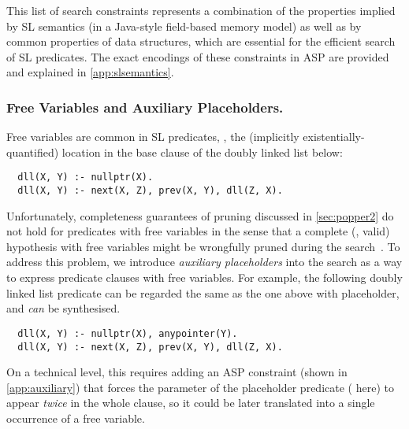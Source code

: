 \noindent
%
This list of search constraints represents a combination of the
properties implied by SL semantics (in a Java-style field-based memory
model) as well as by common properties of data structures, which are
essential for the efficient search of SL predicates.
%
The exact encodings of these constraints in ASP are provided and explained in \autoref{app:slsemantics}.

\subsubsection{Free Variables and Auxiliary Placeholders.}
\label{sec:auxiliary}

Free variables are common in SL predicates, \eg, the (implicitly
existentially-quantified) location  in the base clause of the
 doubly linked list below:
%
\begin{verbatim}
  dll(X, Y) :- nullptr(X).
  dll(X, Y) :- next(X, Z), prev(X, Y), dll(Z, X).
\end{verbatim}
%
Unfortunately, completeness guarantees of pruning discussed in \autoref{sec:popper2}  do not hold for
predicates with free variables in the sense that
 a complete (\ie, valid) hypothesis with free
variables might  be wrongfully pruned during the search~\cite[\S{4.5}]{cropper2021learning}.
%
To address this problem, we introduce \emph{auxiliary placeholders}
into the search as a way to express predicate clauses with free
variables.
%
For example, the following doubly linked list predicate can be
regarded the same as the one above with 
placeholder, and \emph{can} be synthesised.
%
\begin{verbatim}
  dll(X, Y) :- nullptr(X), anypointer(Y).
  dll(X, Y) :- next(X, Z), prev(X, Y), dll(Z, X).
\end{verbatim}
%
On a technical level, this requires adding an ASP constraint (shown in \autoref{app:auxiliary})
that forces the parameter of the placeholder predicate (
here) to appear \emph{twice} in the whole clause, so it could be later
translated into a single occurrence of a free variable.




